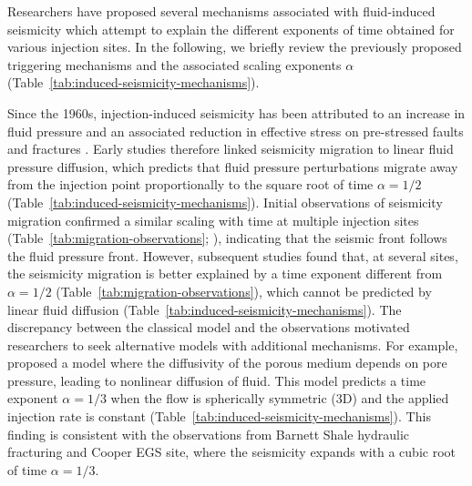 \documentclass[draft]{agujournal2019}
\begin{document}
Researchers have proposed several mechanisms associated with fluid-induced seismicity which attempt to explain the different exponents of time obtained for various injection sites. In the following, we briefly review the previously proposed triggering mechanisms and the associated scaling exponents $\alpha$ (Table~\ref{tab:induced-seismicity-mechanisms}).

Since the 1960s, injection-induced seismicity has been attributed to an increase in fluid pressure and an associated reduction in effective stress on pre-stressed faults and fractures \cite{HealyEtAl1968}.
Early studies therefore linked seismicity migration to linear fluid pressure diffusion, which predicts that fluid pressure perturbations migrate away from the injection point proportionally to the square root of time $\alpha=1/2$ (Table~\ref{tab:induced-seismicity-mechanisms}).
Initial observations of seismicity migration confirmed a similar scaling with time at multiple injection sites (Table~\ref{tab:migration-observations}; ), indicating that the seismic front follows the fluid pressure front.
However, subsequent studies found that, at several sites, the seismicity migration is better explained by a time exponent different from $\alpha=1/2$ (Table~\ref{tab:migration-observations}), which cannot be predicted by linear fluid diffusion (Table~\ref{tab:induced-seismicity-mechanisms}). The discrepancy between the classical model and the observations motivated researchers to seek alternative models with additional mechanisms.
For example, \cite{ShapiroDinske2009} proposed a model where the diffusivity of the porous medium depends on pore pressure, leading to nonlinear diffusion of fluid. This model predicts a time exponent $\alpha = 1/3$ when the flow is spherically symmetric (3D) and the applied injection rate is constant (Table~\ref{tab:induced-seismicity-mechanisms}).
This finding is consistent with the observations from Barnett Shale hydraulic fracturing and Cooper EGS site, where the seismicity expands with a cubic root of time $\alpha=1/3$.
\end{document}
